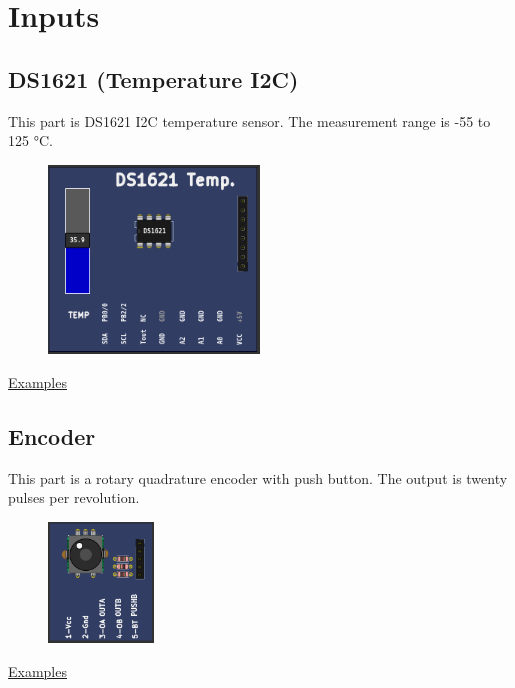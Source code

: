 \section{Inputs}


\subsection{DS1621 (Temperature I2C)}


This part is DS1621 I2C temperature sensor. The measurement range is -55 to 125 °C.

\begin{figure}[H]
\center
\includegraphics[width=0.5\textwidth]{img/part_ds1621.png} 
\end{figure} 


\href{https://lcgamboa.github.io/picsimlab_examples/parts_DS1621_(Temperature_I2C).html}{Examples}


\subsection{Encoder}

This part is a rotary quadrature encoder with push button. The output is twenty pulses per revolution.

\begin{figure}[H]
\center
\includegraphics[width=0.25\textwidth]{img/part_encoder.png} 
\end{figure} 

\href{https://lcgamboa.github.io/picsimlab_examples/parts_Encoder.html}{Examples}
 
